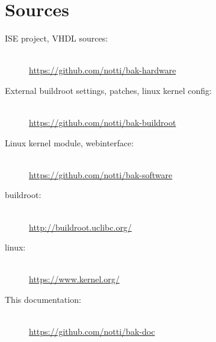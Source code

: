 \documentclass[11pt,technote,a4paper,onecolumn,dvips]{IEEEtran}
\begin{document}
\section{Sources}
\begin{description}
    \item[ISE project, VHDL sources:] \hfill \\
        \url{https://github.com/notti/bak-hardware}
    \item[External buildroot settings, patches, linux kernel config:] \hfill \\
        \url{https://github.com/notti/bak-buildroot}
    \item[Linux kernel module, webinterface:] \hfill \\
        \url{https://github.com/notti/bak-software}
    \item[buildroot:] \hfill \\
        \url{http://buildroot.uclibc.org/}
    \item[linux:] \hfill \\
        \url{https://www.kernel.org/}
    \item[This documentation:] \hfill \\
        \url{https://github.com/notti/bak-doc}
\end{description}


\begingroup
\raggedright
\sloppy

\endgroup
\end{document}
